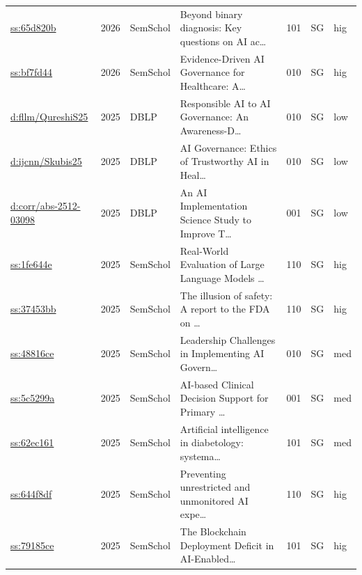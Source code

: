 \begin{table}[p]
\begin{tabularx}{\linewidth}{p{2.2cm} c p{1.4cm} X c p{1cm} p{0.7cm}}
  \href{https://www.semanticscholar.org/paper/65d820b0292c7692166f30f41cd7a7da314d3a8e}{ss:65d820b} & 2026 & SemSchol & Beyond binary diagnosis: Key questions on AI ac\ldots & 101 & SG & hig \\
  \href{https://www.semanticscholar.org/paper/bf7fd44beaf7f754084e4d32a66653337510f911}{ss:bf7fd44} & 2026 & SemSchol & Evidence-Driven AI Governance for Healthcare: A\ldots & 010 & SG & hig \\
  \href{https://dblp.org/rec/conf/fllm/QureshiS25}{d:fllm/QureshiS25} & 2025 & DBLP & Responsible AI to AI Governance: An Awareness-D\ldots & 010 & SG & low \\
  \href{https://dblp.org/rec/conf/ijcnn/Skubis25}{d:ijcnn/Skubis25} & 2025 & DBLP & AI Governance: Ethics of Trustworthy AI in Heal\ldots & 010 & SG & low \\
  \href{https://dblp.org/rec/journals/corr/abs-2512-03098}{d:corr/abs-2512-03098} & 2025 & DBLP & An AI Implementation Science Study to Improve T\ldots & 001 & SG & low \\
  \href{https://www.semanticscholar.org/paper/1fe644e3b971a52cc57b1b5ddc4cba5408cf1a8d}{ss:1fe644e} & 2025 & SemSchol & Real-World Evaluation of Large Language Models \ldots & 110 & SG & hig \\
  \href{https://www.semanticscholar.org/paper/37453bba51312c14c911b237652eaeffff5d8e43}{ss:37453bb} & 2025 & SemSchol & The illusion of safety: A report to the FDA on \ldots & 110 & SG & hig \\
  \href{https://www.semanticscholar.org/paper/48816ceed442327a097e22a1b4a318b6d26e4714}{ss:48816ce} & 2025 & SemSchol & Leadership Challenges in Implementing AI Govern\ldots & 010 & SG & med \\
  \href{https://www.semanticscholar.org/paper/5c5299ab486eb67a79c8ffcf607446e9f5f1fbfe}{ss:5c5299a} & 2025 & SemSchol & AI-based Clinical Decision Support for Primary \ldots & 001 & SG & med \\
  \href{https://www.semanticscholar.org/paper/62ec161b36f7200222e9bfac9b86e3ea61f66276}{ss:62ec161} & 2025 & SemSchol & Artificial intelligence in diabetology: systema\ldots & 101 & SG & med \\
  \href{https://www.semanticscholar.org/paper/644f8df8c9f4f31bfff147a4bff64b77f4e81ffb}{ss:644f8df} & 2025 & SemSchol & Preventing unrestricted and unmonitored AI expe\ldots & 110 & SG & hig \\
  \href{https://www.semanticscholar.org/paper/79185ce1fddf051f42d68633449ea8db3a6f9bf5}{ss:79185ce} & 2025 & SemSchol & The Blockchain Deployment Deficit in AI-Enabled\ldots & 101 & SG & hig \\

\end{tabularx}
\end{table}
